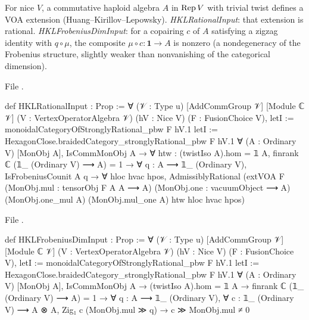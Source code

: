 \begin{definition}\label{l21:def:hkl}
For nice $V$, a commutative haploid algebra $A$ in $\operatorname{Rep} V$ with trivial twist defines a VOA extension
(Huang--Kirillov--Lepowsky). \emph{HKLRationalInput}: that extension is rational. \emph{HKLFrobeniusDimInput}: for a
copairing $c$ of $A$ satisfying a zigzag identity with $q\circ\mu$, the composite $\mu\circ c:\mathbf 1\to A$ is
nonzero (a nondegeneracy of the Frobenius structure, slightly weaker than nonvanishing of the categorical dimension).
\end{definition}
\noindent File .
\begin{leancode}
def HKLRationalInput : Prop :=
  ∀ (𝒱 : Type u) [AddCommGroup 𝒱] [Module ℂ 𝒱] (V : VertexOperatorAlgebra 𝒱) (hV : Nice V)
    (F : FusionChoice V),
    letI := monoidalCategoryOfStronglyRational_pbw F hV.1
    letI := HexagonClose.braidedCategory_stronglyRational_pbw F hV.1
    ∀ (A : Ordinary V) [MonObj A], IsCommMonObj A → ∀ htw : (twistIso A).hom = 𝟙 A,
      finrank ℂ (𝟙_ (Ordinary V) ⟶ A) = 1 → ∀ q : A ⟶ 𝟙_ (Ordinary V), IsFrobeniusCounit A q →
      ∀ hloc hvac hpos,
        AdmissiblyRational (extVOA F (MonObj.mul : tensorObj F A A ⟶ A)
          (MonObj.one : vacuumObject ⟶ A) (MonObj.one_mul A) (MonObj.mul_one A) htw hloc hvac hpos)
\end{leancode}
\noindent File .
\begin{leancode}
def HKLFrobeniusDimInput : Prop :=
  ∀ (𝒱 : Type u) [AddCommGroup 𝒱] [Module ℂ 𝒱] (V : VertexOperatorAlgebra 𝒱) (hV : Nice V)
    (F : FusionChoice V),
    letI := monoidalCategoryOfStronglyRational_pbw F hV.1
    letI := HexagonClose.braidedCategory_stronglyRational_pbw F hV.1
    ∀ (A : Ordinary V) [MonObj A], IsCommMonObj A → (twistIso A).hom = 𝟙 A →
      finrank ℂ (𝟙_ (Ordinary V) ⟶ A) = 1 → ∀ q : A ⟶ 𝟙_ (Ordinary V),
      ∀ c : 𝟙_ (Ordinary V) ⟶ A ⊗ A, Zig₁ c (MonObj.mul ≫ q) → c ≫ MonObj.mul ≠ 0
\end{leancode}

